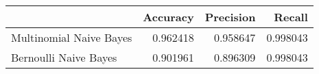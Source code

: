 \begin{tabular}{lrrr}
\toprule
 & Accuracy & Precision & Recall \\
\midrule
Multinomial Naive Bayes & 0.962418 & 0.958647 & 0.998043 \\
Bernoulli Naive Bayes & 0.901961 & 0.896309 & 0.998043 \\
\bottomrule
\end{tabular}
